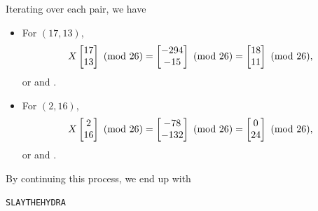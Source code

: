 \documentclass[letterpaper]{article}
\newcommand{\0}{\mathbf{0}}
\begin{document}
\begin{mdframed}
    \begin{mdframed}
        Iterating over each pair, we have 
        \begin{itemize}
            \item For $(17, 13)$, 
            \[X\begin{bmatrix}
                17 \\ 13
            \end{bmatrix} \ (\mathrm{mod}\ 26) = \begin{bmatrix}
                -294 \\ -15
            \end{bmatrix} \ (\mathrm{mod}\ 26) = \begin{bmatrix}
                18 \\ 11
            \end{bmatrix} \ (\mathrm{mod}\ 26),\]
            or  and . 

            \item For $(2, 16)$, 
            \[X\begin{bmatrix}
                2 \\ 16
            \end{bmatrix} \ (\mathrm{mod}\ 26) = \begin{bmatrix}
                -78 \\ -132
            \end{bmatrix} \ (\mathrm{mod}\ 26) = \begin{bmatrix}
                0 \\ 24
            \end{bmatrix} \ (\mathrm{mod}\ 26),\]
            or  and .
        \end{itemize}
        By continuing this process, we end up with 
        \begin{mdframed}
            \begin{verbatim}
SLAYTHEHYDRA\end{verbatim}
        \end{mdframed}
    \end{mdframed}
\end{mdframed}
\end{document}
